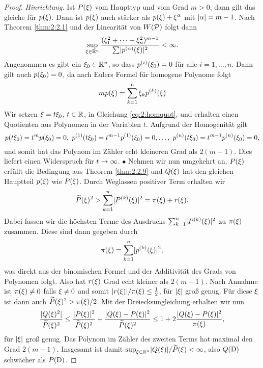 \begin{proof}
{\it Hinrichtung.} Ist $P(\xi)$ vom Haupttyp und vom Grad $m>0$,
dann gilt das gleiche für $p(\xi)$.
Dann ist $p(\xi)$ auch stärker als $p(\xi)+\xi^\alpha$
mit $\lvert\alpha\rvert=m-1$.
Nach Theorem \ref{thm:2:2.1} und der Linearität von $W(\mathcal P)$
folgt dann
\begin{equation}\label{eq:2:homquot}
\sup_{\xi\in\mathbb R^n}\frac{(\xi^2_1+\dots+\xi^2_n)^{m-1}}{\sum\lvert p^{(\alpha)}(\xi)\rvert^2}<\infty.
\end{equation}
Angenommen es gibt ein $\xi_0\in\mathbb R^n$,
so dass $p^{(i)}(\xi_0)=0$ für alle $i=1,\dots,n$.
Dann gilt auch $p(\xi_0)=0$, da nach Eulers Formel für homogene Polynome folgt
\begin{equation}
mp(\xi)=\sum_{k=1}^n\xi_kp^{(k)}(\xi)
\end{equation}
Wir setzen $\xi=t\xi_0$, $t\in\mathbb R$, in Gleichung \eqref{eq:2:homquot},
und erhalten einen Quotienten aus Polynomen in der Variablen $t$.
Aufgrund der Homogenität gilt
\begin{equation}
p(t\xi_0)=t^mp(\xi_0)=0,~p^{(1)}(t\xi_0)=t^{m-1}p^{(1)}(\xi_0)=0,
\dots,~p^{(n)}(t\xi_0)=t^{m-1}p^{(n)}(\xi_0)=0,
\end{equation}
und somit hat das Polynom im Zähler echt kleineren Grad als $2(m-1)$.
Dies liefert einen Widerspruch für $t\to\infty$. $\bullet$
Nehmen wir nun umgekehrt an, $P(\xi)$ erfüllt die Bedingung aus Theorem \ref{thm:2:2.9}
und $Q(\xi)$ hat den gleichen Hauptteil $p(\xi)$ wie $P(\xi)$.
Durch Weglassen positiver Term erhalten wir 
\begin{equation}
\widetilde{P}(\xi)^2>\sum_{k=1}^n\lvert P^{(k)}(\xi)\rvert^2=\pi(\xi)+r(\xi).
\end{equation}
Dabei fassen wir die höchsten Terme des Ausdrucks
$\sum_{k=1}^n\lvert P^{(k)}(\xi)\rvert^2$ zu $\pi(\xi)$ zusammen.
Diese sind dann gegeben durch
\begin{equation}
\pi(\xi)=\sum_{k=1}^n\lvert p^{(k)}(\xi)\rvert^2,
\end{equation}
was direkt aus der binomischen Formel
und der Additivität des Grads von Polynomen folgt.
Also hat $r(\xi)$ Grad echt kleiner als $2(m-1)$.
Nach Annahme ist $\pi(\xi)\neq0$ falls $\xi\neq0$
and somit $\lvert r(\xi)\rvert/\pi(\xi)\leq\tfrac12$,
für $\lvert\xi\rvert$ groß genug.
Für diese $\xi$ ist dann auch $\widetilde{P}(\xi)^2>\pi(\xi)/2$.
Mit der Dreiecksungleichung erhalten wir nun
\begin{equation}
\frac{\lvert Q(\xi)^2\rvert}{\widetilde{P}(\xi)^2}
\leq\frac{\lvert P(\xi)\rvert^2}{\widetilde{P}(\xi)^2}+\frac{\lvert Q(\xi)-P(\xi)\rvert^2}{\widetilde{P}(\xi)^2}
\leq1+2\frac{\lvert Q(\xi)-P(\xi)\rvert^2}{\pi(\xi)},
\end{equation}
für $\lvert\xi\rvert$ groß genug.
Das Polynom im Zähler des zweiten Terms hat maximal den Grad $2(m-1)$.
Insgesamt ist damit $\sup_{\xi\in\mathbb R^n}\lvert Q(\xi)\rvert/\widetilde{P}(\xi)<\infty$,
also $Q(\mathrm D)$ schwächer als $P(\mathrm D)$.
\end{proof}


